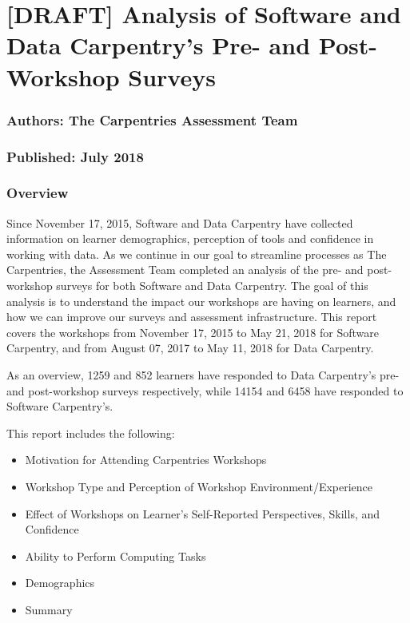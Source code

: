 \documentclass[]{article}
\title{}
\author{}
\date{}
\providecommand{\tightlist}{%
  \setlength{\itemsep}{0pt}\setlength{\parskip}{0pt}}
\begin{document}
\section{{[}DRAFT{]} Analysis of Software and Data Carpentry's Pre- and
Post-Workshop
Surveys}\label{draft-analysis-of-software-and-data-carpentrys-pre--and-post-workshop-surveys}

\subsubsection{Authors: The Carpentries Assessment
Team}\label{authors-the-carpentries-assessment-team}

\subsubsection{Published: July 2018}\label{published-july-2018}

\subsubsection{Overview}\label{overview}

Since November 17, 2015, Software and Data Carpentry have collected
information on learner demographics, perception of tools and confidence
in working with data. As we continue in our goal to streamline processes
as The Carpentries, the Assessment Team completed an analysis of the
pre- and post-workshop surveys for both Software and Data Carpentry. The
goal of this analysis is to understand the impact our workshops are
having on learners, and how we can improve our surveys and assessment
infrastructure. This report covers the workshops from November 17, 2015
to May 21, 2018 for Software Carpentry, and from August 07, 2017 to May
11, 2018 for Data Carpentry.

As an overview, 1259 and 852 learners have responded to Data Carpentry's
pre- and post-workshop surveys respectively, while 14154 and 6458 have
responded to Software Carpentry's.

This report includes the following:

\begin{itemize}
\tightlist
\item
  Motivation for Attending Carpentries Workshops
\item
  Workshop Type and Perception of Workshop Environment/Experience
\item
  Effect of Workshops on Learner's Self-Reported Perspectives, Skills,
  and Confidence
\item
  Ability to Perform Computing Tasks
\item
  Demographics
\item
  Summary
\end{itemize}
\end{document}
